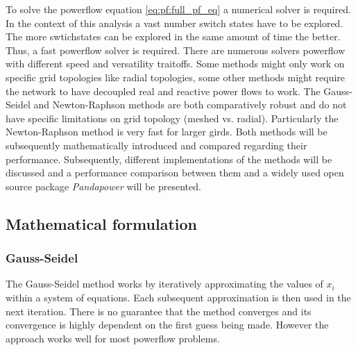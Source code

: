 
To solve the powerflow equation \ref{eq:pf:full_pf_eq} a numerical solver
is required\autocite{power_system_analysis}. In the context of this analysis
a vast number switch states have to be explored. The more swtichstates
can be explored in the same amount of time the better. Thus, a fast powerflow
solver is required. There are numerous solvers powerflow with different speed
and versatility traitoffs\autocite{pf_methods_comparison}. Some methods might
only work on specific grid topologies like radial topologies, some other methods
might require the network to have decoupled real and reactive power flows to work.
The Gauss-Seidel and Newton-Raphson methods are both comparatively robust and do not
have specific limitations on grid topology (meshed vs. radial)\autocite{pf_methods_comparison}.
Particularly the Newton-Raphson method is very fast for larger girds. Both methods
will be subsequently mathematically introduced and compared regarding their performance.
Subsequently, different implementations of the methods will be discussed and a performance
comparison between them and a widely used open source package \textit{Pandapower}\autocite{pandapower2018}
will be presented.

\subsection{Mathematical formulation}

\subsubsection{Gauss-Seidel}

The Gauss-Seidel method works by iteratively approximating the values of $x_i$ within a system of 
equations. Each subsequent approximation is then used in the next iteration. There is no guarantee that
the method converges and its convergence is highly dependent on the first guess being made. However the approach
works well for most powerflow problems\autocite{power_system_analysis}.\\
\\

